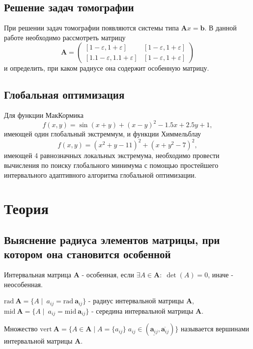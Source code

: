 \documentclass[a4paper]{article}
\begin{document}
\subsection{Решение задач томографии}
При решении задач томографии появляются системы типа $\mathbf{A}x=\mathbf{b}$. В данной работе необходимо рассмотреть матрицу 
\begin{equation}\label{math:tom}
\mathbf{A}=\begin{pmatrix}
  [1-\varepsilon,1+\varepsilon]& [1-\varepsilon,1+\varepsilon]\\
  [1.1-\varepsilon,1.1+\varepsilon]& [1-\varepsilon,1+\varepsilon]
\end{pmatrix}
\end{equation}
и определить, при каком радиусе она содержит особенную матрицу. 
\subsection{Глобальная оптимизация}
Для функции МакКормика
\begin{equation}\label{macCorm}
    f(x,y)=\sin(x+y)+(x-y)^2-1.5x+2.5y+1,
\end{equation}
имеющей один глобальный экстреммум, и функции Химмельблау
\begin{equation}\label{Himmel}
    f(x, y) = (x^2 + y - 11)^2 + (x + y^2 - 7)^2,
\end{equation}
имеющей 4 равнозначных локальных экстремума, необходимо провести вычисления по поиску глобального минимума с помощью простейшего интервального адаптивного алгоритма глобальной оптимизации.
\section{Теория}
\subsection{Выяснение радиуса элементов матрицы, при котором она становится особенной}
Интервальная матрица $\mathbf{A}$ - особенная, если $\exists A\in\mathbf{A}:\;\det(A)=0$, иначе - неособенная. 

$\mathrm{rad}\:\mathbf{A}=\{A\mid\:a_{ij}=\mathrm{rad}\:\mathbf{a}_{ij}\}$ - радиус интервальной матрицы $\mathbf{A}$, $\mathrm{mid}\:\mathbf{A}=\{A\mid\:a_{ij}=\mathrm{mid}\:\mathbf{a}_{ij}\}$ - середина интервальной матрицы $\mathbf{A}$.

Множество $\mathrm{vert}\:\mathbf{A}=\{A\in\mathbf{A}\mid A=\{a_{ij}\}\;a_{ij}\in(\underline{\mathbf{a}_{ij}},\overline{\mathbf{a}_{ij}})\}$ называется вершинами интервальной матрицы $\mathbf{A}$. 
\end{document}

